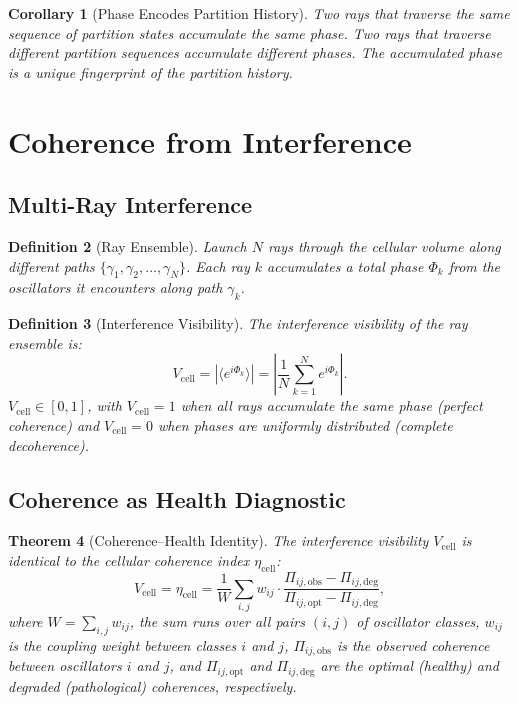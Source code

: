 \documentclass[11pt,twocolumn,a4paper]{article}
\newtheorem{theorem}{Theorem}[section]
\newtheorem{corollary}[theorem]{Corollary}
\newtheorem{definition}[theorem]{Definition}
\newcommand{\etacell}{\eta_{\mathrm{cell}}}
\newcommand{\Vcell}{V_{\mathrm{cell}}}
\begin{document}
\begin{corollary}[Phase Encodes Partition History]
\label{cor:phase-history}
Two rays that traverse the same sequence of partition states
accumulate the same phase. Two rays that traverse different partition
sequences accumulate different phases. The accumulated phase is a
unique fingerprint of the partition history.
\end{corollary}


\section{Coherence from Interference}
\label{sec:coherence}

\subsection{Multi-Ray Interference}

\begin{definition}[Ray Ensemble]
\label{def:ray-ensemble}
Launch $N$ rays through the cellular volume along different paths
$\{\gamma_1, \gamma_2, \ldots, \gamma_N\}$. Each ray $k$ accumulates
a total phase $\Phi_k$ from the oscillators it encounters along path
$\gamma_k$.
\end{definition}

\begin{definition}[Interference Visibility]
\label{def:visibility}
The interference visibility of the ray ensemble is:
\begin{equation}
\Vcell = \left| \langle e^{i\Phi_k} \rangle \right|
  = \left| \frac{1}{N} \sum_{k=1}^{N} e^{i\Phi_k} \right|.
\label{eq:visibility}
\end{equation}
$\Vcell \in [0, 1]$, with $\Vcell = 1$ when all rays accumulate
the same phase (perfect coherence) and $\Vcell = 0$ when phases are
uniformly distributed (complete decoherence).
\end{definition}

\subsection{Coherence as Health Diagnostic}

\begin{theorem}[Coherence--Health Identity]
\label{thm:coherence-health}
The interference visibility $\Vcell$ is identical to the cellular
coherence index $\etacell$:
\begin{equation}
\boxed{
\Vcell = \etacell = \frac{1}{W} \sum_{i,j} w_{ij} \cdot
  \frac{\Pi_{ij,\mathrm{obs}} - \Pi_{ij,\mathrm{deg}}}
  {\Pi_{ij,\mathrm{opt}} - \Pi_{ij,\mathrm{deg}}},
}
\label{eq:coherence-health}
\end{equation}
where $W = \sum_{i,j} w_{ij}$, the sum runs over all pairs $(i,j)$
of oscillator classes, $w_{ij}$ is the coupling weight between classes
$i$ and $j$, $\Pi_{ij,\mathrm{obs}}$ is the observed coherence between
oscillators $i$ and $j$, and $\Pi_{ij,\mathrm{opt}}$ and
$\Pi_{ij,\mathrm{deg}}$ are the optimal (healthy) and degraded
(pathological) coherences, respectively.
\end{theorem}
\end{document}
